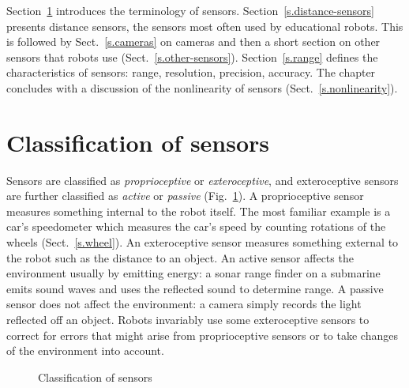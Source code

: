 Section~\ref{s.classify} introduces the terminology of sensors. Section~\ref{s.distance-sensors} presents distance sensors, the sensors most often used by educational robots. This is followed by Sect.~\ref{s.cameras} on cameras and then a short section on other sensors that robots use (Sect.~\ref{s.other-sensors}). Section~\ref{s.range} defines the characteristics of sensors: range, resolution, precision, accuracy. The chapter concludes with a discussion of the nonlinearity of sensors (Sect.~\ref{s.nonlinearity}).

\section{Classification of sensors}\label{s.classify}

Sensors are classified as \emph{proprioceptive} or \emph{exteroceptive}, and exteroceptive sensors are further classified as \emph{active} or \emph{passive} (Fig.~\ref{fig.sensor-classification}). A proprioceptive sensor measures something internal to the robot itself. The most familiar example is a car's speedometer which measures the car's speed by counting rotations of the wheels (Sect.~\ref{s.wheel}). An exteroceptive sensor measures something external to the robot such as the distance to an object. An active sensor affects the environment usually by emitting energy: a sonar range finder on a submarine emits sound waves and uses the reflected sound to determine range. A passive sensor does not affect the environment: a camera simply records the light reflected off an object. Robots invariably use some exteroceptive sensors to correct for errors that might arise from proprioceptive sensors or to take changes of the environment into account.

\begin{figure}
\begin{center}
\caption{Classification of sensors}\label{fig.sensor-classification}
\end{center}
\end{figure}

